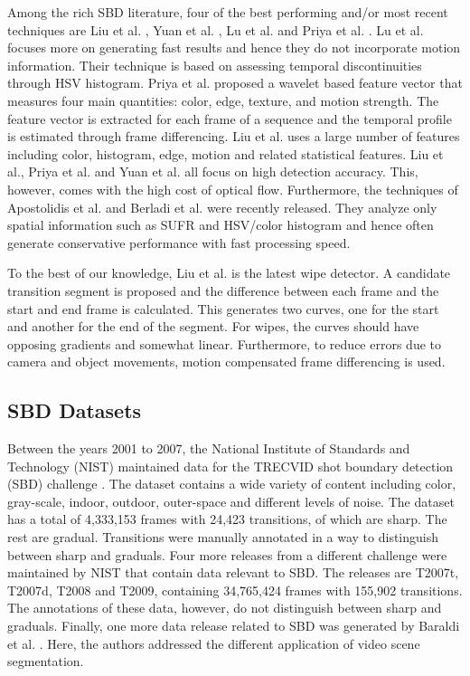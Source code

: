 \documentclass[journal]{IEEEtran}
\begin{document}
Among the rich SBD literature, four of the best performing and/or most recent techniques are Liu et al. \cite{Liu07}, Yuan et al. \cite{Yuan05}, Lu et al. \cite{Lu13} and Priya et al. \cite{Priya14}. Lu et al. focuses more on generating fast results and hence they do not incorporate motion information. Their technique is based on assessing temporal discontinuities through HSV histogram. 
Priya et al. \cite{Priya14} proposed a wavelet based feature vector that measures four main quantities: color, edge, texture, and motion strength. 
The feature vector is extracted for each frame of a sequence and the temporal profile is estimated through frame differencing. Liu et al. \cite{Liu07} uses a large number of features including color, histogram, edge, motion and related statistical features. Liu et al., Priya et al. and Yuan et al. all focus on high detection accuracy. This, however, comes with the high cost of optical flow. Furthermore, the techniques of Apostolidis et al. \cite{Apostolidis14} and Berladi et al. \cite{Berladi15} were recently released. They analyze only spatial information such as SUFR and HSV/color histogram and hence often generate conservative performance with fast processing speed.  


To the best of our knowledge, Liu et al. \cite{Liu07} is the latest wipe detector. A candidate transition segment is proposed and the difference between each frame and the start and end frame is calculated. This generates two curves, one for the start and another for the end of the segment. For wipes, the curves should have opposing gradients and somewhat linear. Furthermore, to reduce errors due to camera and object movements, motion compensated frame differencing is used. 








\subsection{SBD Datasets}

Between the years 2001 to 2007, the National Institute of Standards and Technology (NIST) \cite{NIST} maintained data for the TRECVID shot boundary detection (SBD) challenge \cite{Smeaton10}. The dataset contains a wide variety of content including color, gray-scale, indoor, outdoor, outer-space and different levels of noise. The dataset has a total of 4,333,153 frames with 24,423 transitions,  of which are sharp. The rest are gradual. Transitions were manually annotated in a way to distinguish between sharp and graduals. 
Four more releases from a different challenge were maintained by NIST that contain data relevant to SBD. The releases are T2007t, T2007d, T2008 and T2009, containing 34,765,424 frames with 155,902 transitions. The annotations of these data, however, do not distinguish between sharp and graduals. 
Finally, one more data release related to SBD was generated by Baraldi et al. \cite{Baraldi15}. Here, the authors addressed the different application of video scene segmentation.
\end{document}
